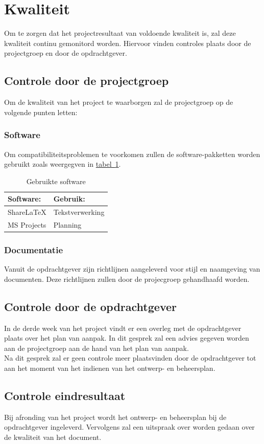 \documentclass[numbers=endperiod]{scrartcl}
\newcommand{\sectionSmall}[1]{
	\vspace{-10pt}
	\section{#1}
	\vspace{-5pt}
}
\newcommand{\whitespace}{\vspace*{2 mm} \\}%
\newcommand{\tableref}[1]{\hyperref[table:#1]{tabel~\ref{table:#1}}}
\begin{document}
	\sectionSmall{Kwaliteit}
	Om te zorgen dat het projectresultaat van voldoende kwaliteit is, zal deze kwaliteit continu gemonitord worden. Hiervoor vinden controles plaats door de projectgroep en door de opdrachtgever.
	\subsection{Controle door de projectgroep}
	Om de kwaliteit van het project te waarborgen zal de projectgroep op de volgende punten letten:
	\subsubsection{Software}
	Om compatibiliteitsproblemen te voorkomen zullen de software-pakketten worden gebruikt zoals weergegven in \tableref{Software}.
	
	\begin{table}[h]
		\caption{Gebruikte software}\label{table:Software}
		
		\centering
		\begin{tabular}{ p{} | p{} }
			Software:	    & Gebruik:          \\ \hline
			ShareLaTeX   	& Tekstverwerking	\\
			MS Projects    	& Planning  		\\
		\end{tabular}
		
	\end{table}
	
	\subsubsection{Documentatie}
	Vanuit de opdrachtgever zijn richtlijnen aangeleverd voor stijl en naamgeving van documenten. Deze richtlijnen zullen door de projecgroep gehandhaafd worden.
	
	\subsection{Controle door de opdrachtgever}
	In de derde week van het project vindt er een overleg met de opdrachtgever plaats over het plan van aanpak. In dit gesprek zal een advies gegeven worden aan de projectgroep aan de hand van het plan van aanpak.
	\whitespace
	Na dit gesprek zal er geen controle meer plaatsvinden door de opdrachtgever tot aan het moment van het indienen van het ontwerp- en beheersplan.
	\subsection{Controle eindresultaat}
	Bij afronding van het project wordt het ontwerp- en beheersplan bij de opdrachtgever ingeleverd. Vervolgens zal een uitspraak over worden gedaan over de kwaliteit van het document. 
	
\end{document}
